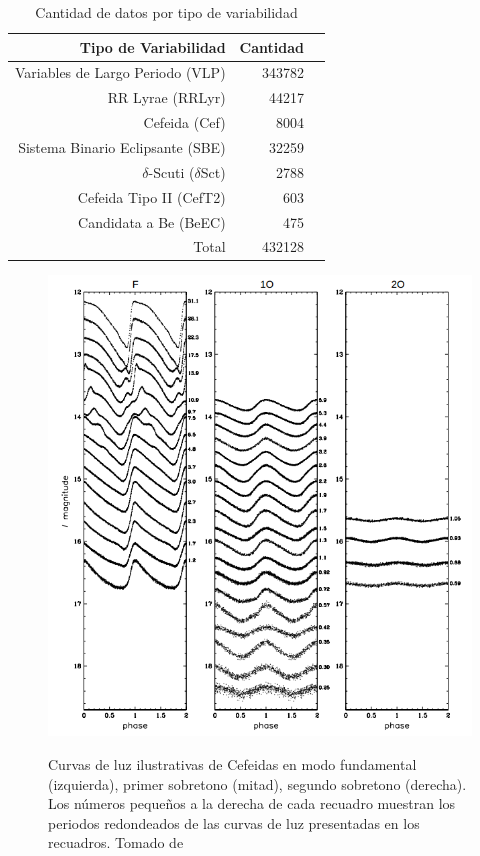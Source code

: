 \documentclass[letterpaper,12pt]{book}
\begin{document}
\begin{table}[ht]
  \centering
  \caption{Cantidad de datos por tipo de variabilidad}
  \label{cuadro:cantidadDatos}
  \begin{tabular}{rrr}
    \hline
    Tipo de Variabilidad & Cantidad \\
    \hline
    Variables de Largo Periodo (VLP) & 343782 \\
    RR Lyrae (RRLyr) & 44217\\
    Cefeida (Cef)& 8004\\
    Sistema Binario Eclipsante (SBE)&32259 \\
    $\delta$-Scuti ($\delta$Sct)& 2788\\
    Cefeida Tipo II (CefT2)& 603\\
    Candidata a Be (BeEC)& 475\\
    \hline
    Total & 432128\\
    \hline
  \end{tabular}
\end{table}




\begin{figure}
  \includegraphics[width = \textwidth]{./img/C2Datos/tiposCefeidas.png}
  \label{fig:tiposCefeidas}
  \caption{Curvas de luz ilustrativas de Cefeidas en modo fundamental (izquierda), primer sobretono (mitad), segundo sobretono (derecha). Los números pequeños a la derecha de cada recuadro muestran los periodos redondeados de las curvas de luz presentadas en los recuadros. Tomado de \cite{soszynski_optical_2011}}
\end{figure}
\end{document}
